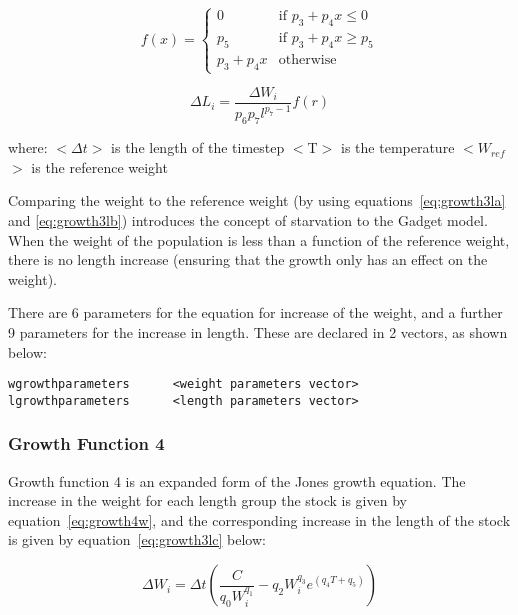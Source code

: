 \documentclass [a4paper, 10pt]{book}
\begin{document}
\begin{equation}\label{eq:growth3lb}
f(x) = 
\begin{cases}
  0
  & \textrm{if $p_{3} + p_{4}x \leq 0$} \\
  p_{5}
  & \textrm{if $p_{3} + p_{4}x \geq p_{5}$} \\ 
  p_{3} + p_{4}x
  & \textrm{otherwise} 
\end{cases}
\end{equation}

\begin{equation}\label{eq:growth3lc}
\Delta L_i = \frac{\Delta W_i} {p_{6} p_{7} l^{p_{7} - 1}} f(r)
\end{equation}

where:\newline
$<$$\Delta t$$>$ is the length of the timestep\newline
$<$T$>$ is the temperature\newline
$<$$W_{ref}$$>$ is the reference weight

\bigskip
Comparing the weight to the reference weight (by using equations~\ref{eq:growth3la} and \ref{eq:growth3lb}) introduces the concept of starvation to the Gadget model.  When the weight of the population is less than a function of the reference weight, there is no length increase (ensuring that the growth only has an effect on the weight).

\bigskip
There are 6 parameters for the equation for increase of the weight, and a further 9 parameters for the increase in length.  These are declared in 2 vectors, as shown below:

\begin{verbatim}
wgrowthparameters      <weight parameters vector>
lgrowthparameters      <length parameters vector>
\end{verbatim}

\subsubsection{Growth Function 4}\label{subsec:growth4}
Growth function 4 is an expanded form of the Jones growth equation.  The increase in the weight for each length group the stock is given by equation~\ref{eq:growth4w}, and the corresponding increase in the length of the stock is given by equation~\ref{eq:growth3lc} below:

\begin{equation}\label{eq:growth4w}
\Delta W_i = \Delta t \left( \frac{C}{q_{0} W_{i}^{q_{1}}} - q_{2} W_{i}^{q_{3}} e^{(q_{4} T + q_{5})} \right)
\end{equation}
\end{document}
